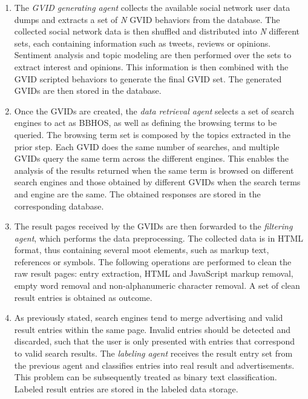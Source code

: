 \begin{enumerate}[label=\Roman*.]
    \item The \textit{GVID generating agent} collects the available social network user data dumps and extracts a set of \textit{N} GVID behaviors from the database. The collected social network data is then shuffled and distributed into \textit{N} different sets, each containing information such as tweets, reviews or opinions. Sentiment analysis and topic modeling are then performed over the sets to extract interest and opinions. This information is then combined with the GVID scripted behaviors to generate the final GVID set. The generated GVIDs are then stored in the database.
    
    \item Once the GVIDs are created, the \textit{data retrieval agent} selects a set of search engines to act as BBHOS, as well as defining the browsing terms to be queried. The browsing term set is composed by the topics extracted in the prior step. Each GVID does the same number of searches, and multiple GVIDs query the same term across the different engines. This enables the analysis of the results returned when the same term is browsed on different search engines and those obtained by different GVIDs when the search terms and engine are the same. The obtained responses are stored in the corresponding database.
    
    \item The result pages received by the GVIDs are then forwarded to the \textit{filtering agent}, which performs the data preprocessing. The collected data is in HTML format, thus containing several moot elements, such as markup text, references or symbols. The following operations are performed to clean the raw result pages: entry extraction, HTML and JavaScript markup removal, empty word removal and non-alphanumeric character removal. A set of clean result entries is obtained as outcome.
    
    \item As previously stated, search engines tend to merge advertising and valid result entries within the same page. Invalid entries should be detected and discarded, such that the user is only presented with entries that correspond to valid search results. The \textit{labeling agent} receives the result entry set from the previous agent and classifies entries into real result and advertisements. This problem can be subsequently treated as binary text classification. Labeled result entries are stored in the labeled data storage.
    

\end{enumerate}
